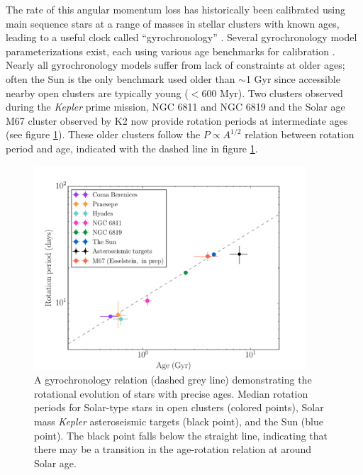 \documentclass[12pt]{article}
\newcommand{\Kepler}{\textsl{Kepler}\xspace}
\newcommand{\eg}{{\it e.g.}}
\begin{document}
The rate of this angular momentum loss has historically been calibrated using
main sequence stars at a range of masses in stellar clusters with known ages,
leading to a useful clock called ``gyrochronology'' \citep{barnes2003}.
Several gyrochronology model parameterizations exist, each using various age
benchmarks for calibration \citep[\eg][]{barnes2007, barnes2010, mamajek2008,
Matt2012, van-saders2013, angus2015, van-saders2016}.
Nearly all gyrochronology models suffer from lack of constraints at older
ages; often the Sun is the only benchmark used older than $\sim$1 Gyr since
accessible nearby open clusters are typically young ($<600$ Myr).
Two clusters observed during the \Kepler prime mission, NGC 6811 and NGC 6819
and the Solar age M67 cluster observed by K2 now provide rotation periods at
intermediate ages (see figure \ref{fig:gyro}).
These older clusters follow the $P \propto A^{1/2}$ relation between rotation
period and age, indicated with the dashed line in figure \ref{fig:gyro}.

\begin{figure}[!t]
\centering
\includegraphics[width=4in]{AAS_talk_M67_astero.pdf}
    \caption{A gyrochronology relation (dashed grey line) demonstrating the
    rotational evolution of stars with precise ages.
    Median rotation periods for Solar-type stars in open clusters (colored points), Solar mass \Kepler asteroseismic targets (black point), and the Sun (blue point).
    The black point falls below the straight line, indicating that there may
    be a transition in the age-rotation relation at around Solar age.}
\label{fig:gyro}
\end{figure}
\end{document}
